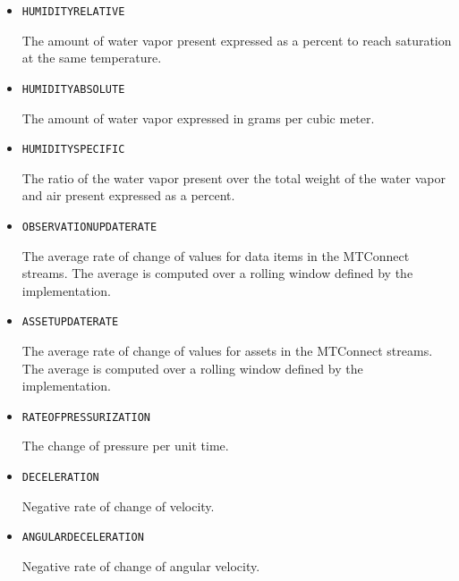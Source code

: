 \begin{itemize}
\item \texttt{HUMIDITY\textunderscore RELATIVE}  

The amount of water vapor present expressed as a percent to reach saturation at the same temperature.


\item \texttt{HUMIDITY\textunderscore ABSOLUTE}  

The amount of water vapor expressed in grams per cubic meter.


\item \texttt{HUMIDITY\textunderscore SPECIFIC}  

The ratio of the water vapor present over the total weight of the water vapor and air present expressed as a percent.


\item \texttt{OBSERVATION\textunderscore UPDATE\textunderscore RATE}  

The average rate of change of values for data items in the MTConnect streams. The average is computed over a rolling window defined by the implementation.


\item \texttt{ASSET\textunderscore UPDATE\textunderscore RATE}  

The average rate of change of values for assets in the MTConnect streams. The average is computed over a rolling window defined by the implementation.


\item \texttt{RATE\textunderscore OF\textunderscore PRESSURIZATION}  

The change of pressure per unit time.


\item \texttt{DECELERATION}  

Negative rate of change of velocity.


\item \texttt{ANGULAR\textunderscore DECELERATION}  

Negative rate of change of angular velocity.

\end{itemize}

